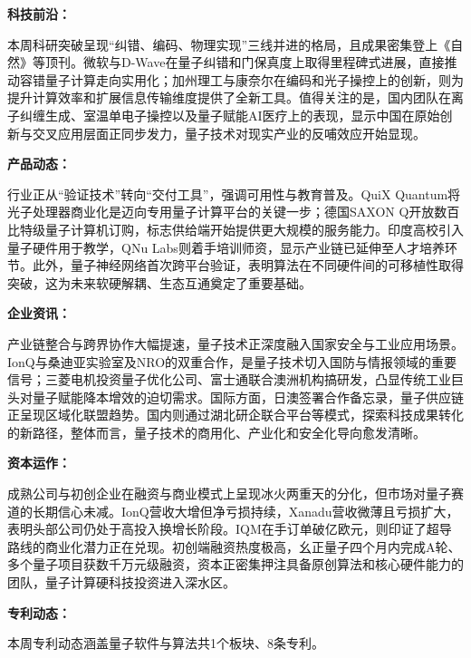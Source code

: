 \documentclass[12pt,a4paper]{ctexart}
\begin{document}
\textbf{ 科技前沿：}

本周科研突破呈现“纠错、编码、物理实现”三线并进的格局，且成果密集登上《自然》等顶刊。微软与D-Wave在量子纠错和门保真度上取得里程碑式进展，直接推动容错量子计算走向实用化；加州理工与康奈尔在编码和光子操控上的创新，则为提升计算效率和扩展信息传输维度提供了全新工具。值得关注的是，国内团队在离子纠缠生成、室温单电子操控以及量子赋能AI医疗上的表现，显示中国在原始创新与交叉应用层面正同步发力，量子技术对现实产业的反哺效应开始显现。


\textbf{ 产品动态：}

行业正从“验证技术”转向“交付工具”，强调可用性与教育普及。QuiX Quantum将光子处理器商业化是迈向专用量子计算平台的关键一步；德国SAXON Q开放数百比特级量子计算机订购，标志供给端开始提供更大规模的服务能力。印度高校引入量子硬件用于教学，QNu Labs则着手培训师资，显示产业链已延伸至人才培养环节。此外，量子神经网络首次跨平台验证，表明算法在不同硬件间的可移植性取得突破，这为未来软硬解耦、生态互通奠定了重要基础。


\textbf{ 企业资讯：}

产业链整合与跨界协作大幅提速，量子技术正深度融入国家安全与工业应用场景。IonQ与桑迪亚实验室及NRO的双重合作，是量子技术切入国防与情报领域的重要信号；三菱电机投资量子优化公司、富士通联合澳洲机构搞研发，凸显传统工业巨头对量子赋能降本增效的迫切需求。国际方面，日澳签署合作备忘录，量子供应链正呈现区域化联盟趋势。国内则通过湖北研企联合平台等模式，探索科技成果转化的新路径，整体而言，量子技术的商用化、产业化和安全化导向愈发清晰。


\textbf{ 资本运作：}

成熟公司与初创企业在融资与商业模式上呈现冰火两重天的分化，但市场对量子赛道的长期信心未减。IonQ营收大增但净亏损持续，Xanadu营收微薄且亏损扩大，表明头部公司仍处于高投入换增长阶段。IQM在手订单破亿欧元，则印证了超导路线的商业化潜力正在兑现。初创端融资热度极高，幺正量子四个月内完成A轮、多个量子项目获数千万元级融资，资本正密集押注具备原创算法和核心硬件能力的团队，量子计算硬科技投资进入深水区。




\textbf{ 专利动态：}

本周专利动态涵盖量子软件与算法共1个板块、8条专利。
\end{document}

